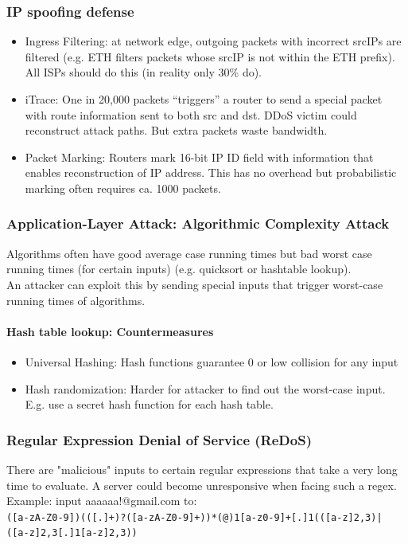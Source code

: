 \subsubsection{IP spoofing defense}

\begin{itemize}
	\item Ingress Filtering: at network edge, outgoing packets with incorrect srcIPs are filtered (e.g. ETH filters packets whose srcIP is not within the ETH prefix). All ISPs should do this (in reality only 30\% do).
	\item iTrace: One in 20,000 packets “triggers” a router to send a special packet with route information sent to both src and dst. DDoS victim could reconstruct attack paths. But extra packets waste bandwidth.
	\item Packet Marking: Routers mark 16-bit IP ID field with information that enables reconstruction of IP address. This has no overhead but probabilistic marking often requires ca. 1000 packets.
\end{itemize}

\subsubsection{Application-Layer Attack: Algorithmic Complexity Attack}
Algorithms often have good average case running times but bad worst case running times (for certain inputs) (e.g. quicksort or hashtable lookup).\\
An attacker can exploit this by sending special inputs that trigger worst-case running times of algorithms.

\paragraph{Hash table lookup: Countermeasures}
\begin{itemize}
    \item Universal Hashing: Hash functions guarantee 0 or low collision for any input
    \item Hash randomization: Harder for attacker to find out the worst-case input. E.g. use a secret hash function for each hash table.
\end{itemize}

\subsubsection{Regular Expression Denial of Service (ReDoS)}
There are "malicious" inputs to certain regular expressions that take a very long time to evaluate. A server could become unresponsive when facing such a regex.\\
Example: input aaaaaa!@gmail.com to:\\
\texttt{([a-zA-Z0-9])(([\-.]+)?([a-zA-Z0-9]+))*(@){1}[a-z0-9]+[.]{1}(([a-z]{2,3})| ([a-z]{2,3}[.]{1}[a-z]{2,3}))}


